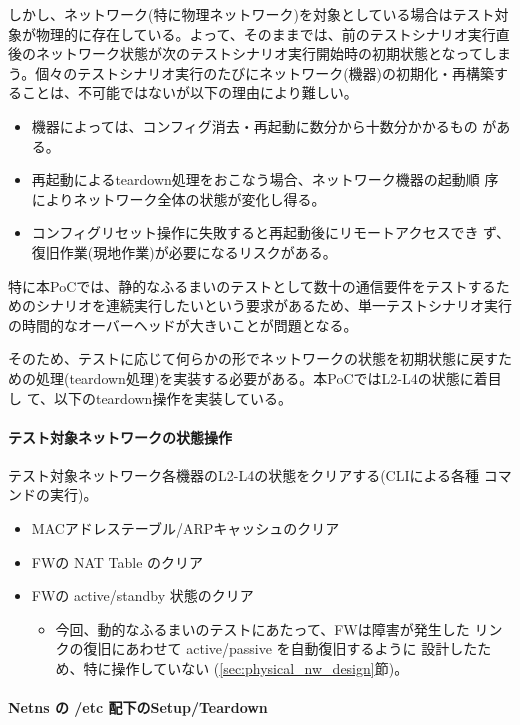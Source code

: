 しかし、ネットワーク(特に物理ネットワーク)を対象としている場合はテスト対
象が物理的に存在している。よって、そのままでは、前のテストシナリオ実行直
後のネットワーク状態が次のテストシナリオ実行開始時の初期状態となってしま
う。個々のテストシナリオ実行のたびにネットワーク(機器)の初期化・再構築す
ることは、不可能ではないが以下の理由により難しい。
\begin{itemize}
 \item 機器によっては、コンフィグ消去・再起動に数分から十数分かかるもの
       がある。
 \item 再起動によるteardown処理をおこなう場合、ネットワーク機器の起動順
       序によりネットワーク全体の状態が変化し得る。
 \item コンフィグリセット操作に失敗すると再起動後にリモートアクセスでき
       ず、復旧作業(現地作業)が必要になるリスクがある。
\end{itemize}
特に本PoCでは、静的なふるまいのテストとして数十の通信要件をテストするた
めのシナリオを連続実行したいという要求があるため、単一テストシナリオ実行
の時間的なオーバーヘッドが大きいことが問題となる。

そのため、テストに応じて何らかの形でネットワークの状態を初期状態に戻すた
めの処理(teardown処理)を実装する必要がある。本PoCではL2-L4の状態に着目し
て、以下のteardown操作を実装している。

    \paragraph{テスト対象ネットワークの状態操作}
テスト対象ネットワーク各機器のL2-L4の状態をクリアする(CLIによる各種
コマンドの実行)。
\begin{itemize}
 \item MACアドレステーブル/ARPキャッシュのクリア
 \item FWの NAT Table のクリア
 \item FWの active/standby 状態のクリア
       \begin{itemize}
        \item 今回、動的なふるまいのテストにあたって、FWは障害が発生した
              リンクの復旧にあわせて active/passive を自動復旧するように
              設計したため、特に操作していない
              (\ref{sec:physical_nw_design}節)。
       \end{itemize}
\end{itemize}

    \paragraph{Netns の /etc 配下のSetup/Teardown}

